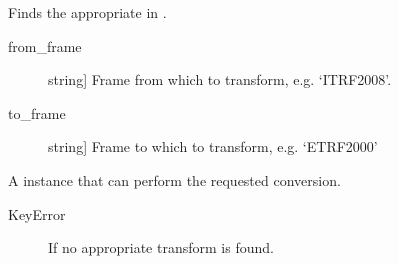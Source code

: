 \documentclass[a4paper,10pt,english]{sphinxmanual}
\begin{document}
\begin{fulllineitems}
\label{\detokenize{api-docs:etrsitrs.main.find_transform}}
Finds the appropriate  in .

\begin{description}
\item[{from\_frame}] \leavevmode{[}string{]}
Frame from which to transform, e.g. ‘ITRF2008’.

\item[{to\_frame}] \leavevmode{[}string{]}
Frame to which to transform, e.g. ‘ETRF2000’

\end{description}


A  instance that can perform the requested
conversion.

\begin{description}
\item[{KeyError}] \leavevmode
If no appropriate transform is found.

\end{description}



\end{fulllineitems}
\end{document}
